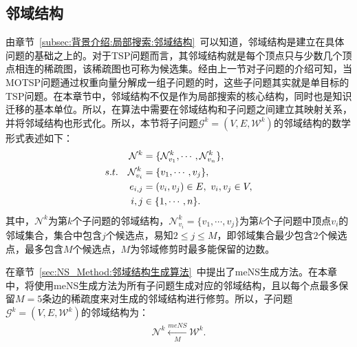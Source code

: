 \subsection{邻域结构}
\label{subsec:NST:邻域结构迁移:邻域结构}
由章节~\ref{subsec:背景介绍:局部搜索:邻域结构}~可以知道，邻域结构是建立在具体问题的基础之上的。对于TSP问题而言，其邻域结构就是每个顶点只与少数几个顶点相连的稀疏图，该稀疏图也可称为候选集。经由上一节对子问题的介绍可知，当MOTSP问题通过权重向量分解成一组子问题的时，这些子问题其实就是单目标的TSP问题。在本章节中，邻域结构不仅是作为局部搜索的核心结构，同时也是知识迁移的基本单位。所以，在算法中需要在邻域结构和子问题之间建立其映射关系，并将邻域结构也形式化。所以，本节将子问题$\mathcal{G}^k= (V, E, \mathcal{W}^k)$的邻域结构的数学形式表述如下：
\begin{align}
    \label{eq:NST:邻域结构}
    \mathcal{N}^{k} & = \{ \mathcal{N}^{k}_{v_1}, \cdots, \mathcal{N}^{k}_{v_n} \},  \\
    s.t. \quad \mathcal{N}^{k}_{v_i} & = \{ v_1, \cdots, v_j \}, \notag \\
    e_{i,j} & = (v_i,v_j) \in E, \ v_i,v_j \in V, \notag \\
    i,j & \in \{1, \cdots, n\}. \notag
\end{align}
其中，$\mathcal{N}^{k}$为第$k$个子问题的邻域结构，$\mathcal{N}^{k}_{v_i} = \{ v_1, \cdots, v_j \}$为第$k$个子问题中顶点$v_i$的邻域集合，集合中包含$j$个候选点，易知$2 \leq j \leq M$，即邻域集合最少包含$2$个候选点，最多包含$M$个候选点，$M$为邻域修剪时最多能保留的边数。
\par
在章节~\ref{sec:NS_Method:邻域结构生成算法}~中提出了meNS生成方法。在本章中，将使用meNS生成方法为所有子问题生成对应的邻域结构，且以每个点最多保留$M=5$条边的稀疏度来对生成的邻域结构进行修剪。所以，子问题$\mathcal{G}^k = (V, E, \mathcal{W}^k)$的邻域结构为：
\begin{align}
    \label{eq:NST:meNS}
    \mathcal{N}^{k} \xleftarrow[M]{meNS} \mathcal{W}^k.
\end{align}

